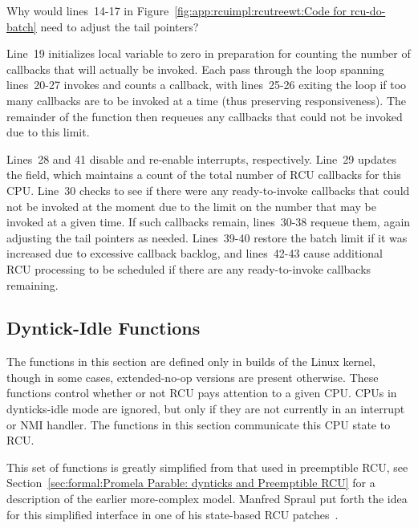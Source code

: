 \QuickQuiz{}
	Why would lines~14-17 in
	Figure~\ref{fig:app:rcuimpl:rcutreewt:Code for rcu-do-batch}
	need to adjust the tail pointers?
 \QuickQuizEnd

Line~19 initializes local variable  to zero in preparation
for counting the number of callbacks that will actually be invoked.
Each pass through the loop spanning lines~20-27 invokes and counts
a callback, with lines~25-26 exiting the loop if too many callbacks
are to be invoked at a time (thus preserving responsiveness).
The remainder of the function then requeues any callbacks that could
not be invoked due to this limit.

Lines~28 and 41 disable and re-enable interrupts, respectively.
Line~29 updates the  field, which maintains a count
of the total number of RCU callbacks for this CPU.
Line~30 checks to see if there were any ready-to-invoke callbacks
that could not be invoked at the moment due to the limit on the
number that may be invoked at a given time.
If such callbacks remain, lines~30-38 requeue them, again adjusting
the tail pointers as needed.
Lines~39-40 restore the batch limit if it was increased due to
excessive callback backlog, and lines~42-43 cause additional RCU
processing to be scheduled if there are any ready-to-invoke
callbacks remaining.

\subsection{Dyntick-Idle Functions}
\label{app:rcuimpl:rcutreewt:Dyntick-Idle Functions}

The functions in this section are defined only in 
builds of the Linux kernel,
though in some cases, extended-no-op versions are present otherwise.
These functions control whether or not RCU pays attention to a given CPU.
CPUs in dynticks-idle mode are ignored, but only if they are not
currently in an interrupt or NMI handler.
The functions in this section communicate this CPU state to RCU.

This set of functions is greatly simplified from that used in
preemptible RCU, see
Section~\ref{sec:formal:Promela Parable: dynticks and Preemptible RCU}
for a description of the earlier more-complex model.
Manfred Spraul put forth the idea for this simplified interface in
one of his state-based RCU
patches~\cite{ManfredSpraul2008StateMachineRCU,ManfredSpraul2008dyntickIRQNMI}.

